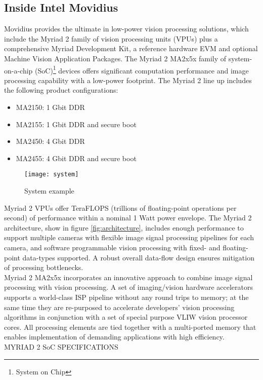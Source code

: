 \subsection{Inside Intel Movidius}
\label{subsec:techspec}
Movidius provides the ultimate in low-power vision processing solutions, which 
include the Myriad 2 family of vision processing units (VPUs) plus a 
comprehensive Myriad Development Kit, a reference hardware EVM and 
optional Machine Vision Application Packages.
The Myriad 2 MA2x5x family of system-on-a-chip (SoC)\footnote{System on Chip} 
devices offers significant computation performance and image processing 
capability with a low-power footprint.
The Myriad 2 line up includes the following product configurations:
\begin{itemize}
	\item	MA2150: 1 Gbit DDR
	\item	MA2155: 1 Gbit DDR and secure boot 
	\item	MA2450: 4 Gbit DDR
	\item	MA2455: 4 Gbit DDR and secure boot
\end{itemize}
%
\begin{figure}[!h]
\centering
\texttt{[image: system]}
\caption{System example}
\label{fig:systemexample}
\end{figure}
% 
Myriad 2 VPUs offer TeraFLOPS (trillions of floating-point operations per 
second) of performance within a nominal 1 Watt power envelope. 
The Myriad 2 architecture, show in figure \ref{fig:architecture}, includes enough 
performance to support multiple cameras with flexible image signal processing 
pipelines for each camera, and software programmable vision processing with 
fixed- and floating-point data-types supported. 
A robust overall data-flow design ensures mitigation of processing bottlenecks.\\
Myriad 2 MA2x5x incorporates an innovative approach to combine image signal 
processing with vision processing. 
A set of imaging/vision hardware accelerators supports a world-class ISP pipeline 
without any round trips to memory; at the same time they are re-purposed to 
accelerate developers' vision processing algorithms in conjunction with a set of 
special purpose VLIW vision processor cores. 
All processing elements are tied together with a multi-ported memory that enables 
implementation of demanding applications with high efficiency.\cite{intel}\\
MYRIAD 2 SoC SPECIFICATIONS
